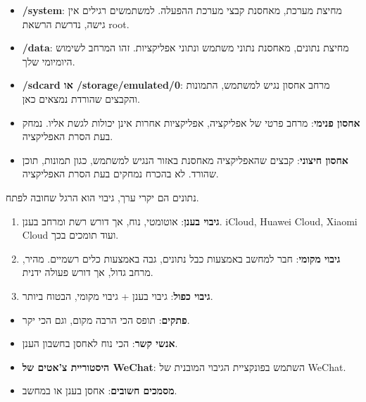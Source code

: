 
\begin{itemize}
  \item \textbf{/system}: מחיצת מערכת, מאחסנת קבצי מערכת ההפעלה. למשתמשים רגילים אין גישה, נדרשת הרשאת root.
  \item \textbf{/data}: מחיצת נתונים, מאחסנת נתוני משתמש ונתוני אפליקציות. זהו המרחב לשימוש היומיומי שלך.
  \item \textbf{/sdcard או /storage/emulated/0}: מרחב אחסון נגיש למשתמש, התמונות והקבצים שהורדת נמצאים כאן.
\end{itemize}


\begin{itemize}
  \item \textbf{אחסון פנימי}: מרחב פרטי של אפליקציה, אפליקציות אחרות אינן יכולות לגשת אליו. נמחק בעת הסרת האפליקציה.
  \item \textbf{אחסון חיצוני}: קבצים שהאפליקציה מאחסנת באזור הנגיש למשתמש, כגון תמונות, תוכן שהורד. לא בהכרח נמחקים בעת הסרת האפליקציה.
\end{itemize}


נתונים הם יקרי ערך, גיבוי הוא הרגל שחובה לפתח.


\begin{enumerate}
  \item \textbf{גיבוי בענן}: אוטומטי, נוח, אך דורש רשת ומרחב בענן. iCloud, Huawei Cloud, Xiaomi Cloud ועוד תומכים בכך.
  \item \textbf{גיבוי מקומי}: חבר למחשב באמצעות כבל נתונים, גבה באמצעות כלים רשמיים. מהיר, מרחב גדול, אך דורש פעולה ידנית.
  \item \textbf{גיבוי כפול}: גיבוי בענן + גיבוי מקומי, הבטוח ביותר.
\end{enumerate}


\begin{itemize}
  \item \textbf{פתקים}: תופס הכי הרבה מקום, וגם הכי יקר.
  \item \textbf{אנשי קשר}: הכי נוח לאחסן בחשבון הענן.
  \item \textbf{היסטוריית צ'אטים של WeChat}: השתמש בפונקציית הגיבוי המובנית של WeChat.
  \item \textbf{מסמכים חשובים}: אחסן בענן או במחשב.
\end{itemize}

